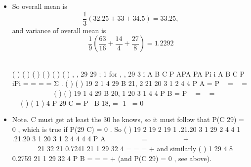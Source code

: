 \documentclass[a4paper,12pt]{article}
\begin{document}
\begin{enumerate}
\begin{itemize}
\item So overall mean is 
\[ \frac{1}{3}  (32.25 + 33  + 34.5) = 33.25,\]
and variance of overall mean is 
\[ \frac{1}{9}  (\frac{63}{16} + \frac{14}{4}  + \frac{27}{8}) = 1.2292\] 

( ) ( ) ( )
( ) ( ) ( )
, ,
29 29 ; 1 for , ,
29 3
i A B C
P APA
PA Pi i A B C
P iPi
=
  = = = Σ .
( ) ( )
19 2
1
4
29 B 21, 2 21 20 3 1
2 4 4
P A = P  =  = \times        
( ) ( )
19
1
4
29 B 20, 1 20 3 1
4 4
P B = P  =  =        
( ) ( 1 )
4 P 29 C = P B 18, = -1 = 0
\item  Note. C must get at least the 30 he knows, so it must follow that
  P(C 29) = 0 , which is true if P(29 C) = 0 .
So ( )
19 2
19 2 19
1 .21.20 3 1
29 2 4 4
1 .21.20 3 1 20 3 1
2 4 4 4 4
P A
   
   
=    
    +            
       
21
32 21 0.7241 21 1 29
32 4
= = =
  +
  and similarly
( )
1
29 4 8 0.2759 21 1 29
32 4
P B = = =
  +
  (and P(C 29) = 0 , see above).
\end{itemize}

\end{enumerate}
\end{document}

